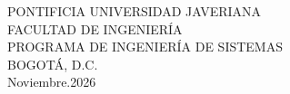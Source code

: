 \begin{center}
        \vspace{1cm}

         \large
        PONTIFICIA UNIVERSIDAD JAVERIANA \\
        \vspace{0.5cm}
        FACULTAD DE INGENIERÍA \\
        \vspace{0.5cm}
        PROGRAMA DE INGENIERÍA DE SISTEMAS \\
        \vspace{0.5cm}
        BOGOTÁ, D.C. \\
        \vspace{0.5cm}
        Noviembre.2026
        
    \end{center}

